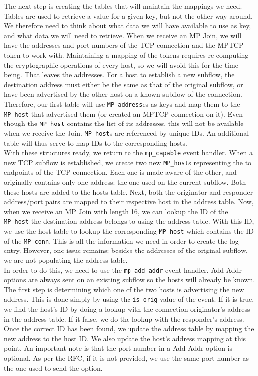 The next step is creating the tables that will maintain the mappings we need. Tables are used to retrieve a value for a given key, but not the other way around. We therefore need to think about what data we will have available to use as key, and what data we will need to retrieve. When we receive an MP Join, we will have the addresses and port numbers of the TCP connection and the MPTCP token to work with. Maintaining a mapping of the tokens requires re-computing the cryptographic operations of every host, so we will avoid this for the time being. That leaves the addresses. For a host to establish a new subflow, the destination address must either be the same as that of the original subflow, or have been advertised by the other host on a known subflow of the connection. Therefore, our first table will use \texttt{MP\_address}es as keys and map them to the \texttt{MP\_host} that advertised them (or created an MPTCP connection on it). Even though the \texttt{MP\_host} contains the list of its addresses, this will not be available when we receive the Join. \texttt{MP\_host}s are referenced by unique IDs. An additional table will thus serve to map IDs to the corresponding hosts.\\

With these structures ready, we return to the \texttt{mp\_capable} event handler. When a new TCP subflow is established, we create two new \texttt{MP\_host}s representing the to endpoints of the TCP connection. Each one is made aware of the other, and originally contains only one address: the one used on the current subflow. Both these hosts are added to the hosts table. Next, both the originator and responder address/port pairs are mapped to their respective host in the address table. Now, when we receive an MP Join with length 16, we can lookup the ID of the \texttt{MP\_host} the destination address belongs to using the address table. With this ID, we use the host table to lookup the corresponding \texttt{MP\_host} which contains the ID of the \texttt{MP\_conn}. This is all the information we need in order to create the log entry. However, one issue remains: besides the addresses of the original subflow, we are not populating the address table. \\

In order to do this, we need to use the \texttt{mp\_add\_addr} event handler. Add Addr options are always sent on an existing subflow so the hosts will already be known. The first step is determining which one of the two hosts is advertising the new address. This is done simply by using the \texttt{is\_orig} value of the event. If it is true, we find the host's ID by doing a lookup with the connection originator's address in the address table. If it false, we do the lookup with the responder's address. Once the correct ID has been found, we update the address table by mapping the new address to the host ID. We also update the host's address mapping at this point. An important note is that the port number in a Add Addr option is optional. As per the RFC, if it is not provided, we  use the same port number as the one used to send the option. \\

